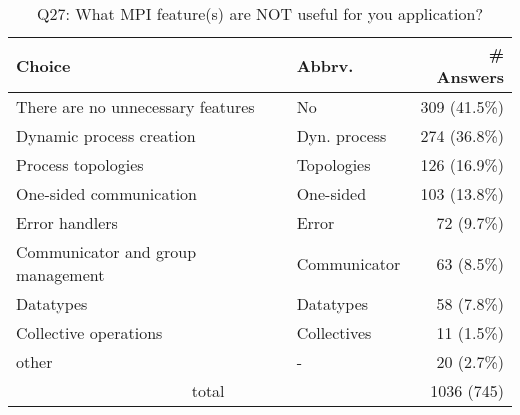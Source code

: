 \begin{table}[htb]%
\begin{center}%
\caption{Q27: What MPI feature(s) are NOT useful for you application?}%
\label{tab:Q27-ans}%
\begin{tabular}{l|l|r}%
\hline%
Choice & Abbrv. & \# Answers \\%
\hline%
There are no unnecessary features & No & 309 (41.5\%) \\%
Dynamic process creation & Dyn. process & 274 (36.8\%) \\%
Process topologies & Topologies & 126 (16.9\%) \\%
One-sided communication & One-sided & 103 (13.8\%) \\%
Error handlers & Error & 72 (9.7\%) \\%
Communicator and group management & Communicator & 63 (8.5\%) \\%
Datatypes & Datatypes & 58 (7.8\%) \\%
Collective operations & Collectives & 11 (1.5\%) \\%
other & - & 20 (2.7\%) \\%
\hline%
\multicolumn{2}{c}{total} & 1036 (745)\\%
\hline%
\end{tabular}%
\end{center}%
\end{table}%
